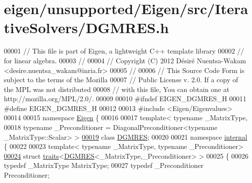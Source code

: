 \hypertarget{eigen_2unsupported_2_eigen_2src_2_iterative_solvers_2_d_g_m_r_e_s_8h_source}{}\section{eigen/unsupported/\+Eigen/src/\+Iterative\+Solvers/\+D\+G\+M\+R\+ES.h}
\label{eigen_2unsupported_2_eigen_2src_2_iterative_solvers_2_d_g_m_r_e_s_8h_source}

\begin{DoxyCode}
00001 \textcolor{comment}{// This file is part of Eigen, a lightweight C++ template library}
00002 \textcolor{comment}{// for linear algebra.}
00003 \textcolor{comment}{//}
00004 \textcolor{comment}{// Copyright (C) 2012 Désiré Nuentsa-Wakam <desire.nuentsa\_wakam@inria.fr>}
00005 \textcolor{comment}{//}
00006 \textcolor{comment}{// This Source Code Form is subject to the terms of the Mozilla}
00007 \textcolor{comment}{// Public License v. 2.0. If a copy of the MPL was not distributed}
00008 \textcolor{comment}{// with this file, You can obtain one at http://mozilla.org/MPL/2.0/.}
00009 
00010 \textcolor{preprocessor}{#ifndef EIGEN\_DGMRES\_H}
00011 \textcolor{preprocessor}{#define EIGEN\_DGMRES\_H}
00012 
00013 \textcolor{preprocessor}{#include <Eigen/Eigenvalues>}
00014 
00015 \textcolor{keyword}{namespace }\hyperlink{namespace_eigen}{Eigen} \{ 
00016   
00017 \textcolor{keyword}{template}< \textcolor{keyword}{typename} \_MatrixType,
00018           \textcolor{keyword}{typename} \_Preconditioner = DiagonalPreconditioner<typename \_MatrixType::Scalar> >
\hyperlink{class_eigen_1_1_d_g_m_r_e_s}{00019} \textcolor{keyword}{class }\hyperlink{class_eigen_1_1_d_g_m_r_e_s}{DGMRES};
00020 
00021 \textcolor{keyword}{namespace }\hyperlink{namespaceinternal}{internal} \{
00022 
00023 \textcolor{keyword}{template}< \textcolor{keyword}{typename} \_MatrixType, \textcolor{keyword}{typename} \_Preconditioner>
\hyperlink{struct_eigen_1_1internal_1_1traits_3_01_d_g_m_r_e_s_3_01___matrix_type_00_01___preconditioner_01_4_01_4}{00024} \textcolor{keyword}{struct }\hyperlink{struct_eigen_1_1internal_1_1traits}{traits}<\hyperlink{class_eigen_1_1_d_g_m_r_e_s}{DGMRES}<\_MatrixType,\_Preconditioner> >
00025 \{
00026   \textcolor{keyword}{typedef} \_MatrixType MatrixType;
00027   \textcolor{keyword}{typedef} \_Preconditioner Preconditioner;

\end{DoxyCode}
